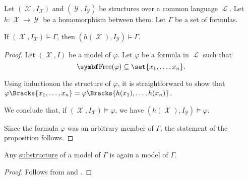 \begin{proposition}\label{thm:first_order_homomorphism_preserves_models}\mcite\cite[def. 23.8]{OpenLogic20201202}
  Let \( (\mscrX, I_{\mscrX}) \) and \( (\mscrY, I_{\mscrY}) \) be structures over a common language \( \mscrL \). Let \( h: \mscrX \to \mscrY \) be a homomorphism between them. Let \( \Gamma \) be a set of formulas.

  If \( (\mscrX, I_{\mscrX}) \models \Gamma \), then \( (h(\mscrX), I_{\mscrY}) \models \Gamma \).
\end{proposition}
\begin{proof}
  Let \( (\mscrX, I) \) be a model of \( \varphi \). Let \( \varphi \) be a formula in \( \mscrL \) such that
  \begin{equation*}
    \bfop{Free}(\varphi) \subseteq \set{x_1, \ldots, x_n}.
  \end{equation*}

  Using induction\IND on the structure of \( \varphi \), it is straightforward to show that \( \varphi\Bracks{x_1, \ldots, x_n} = \varphi\Bracks{h(x_1), \ldots, h(x_n)} \).

  We conclude that, if \( (\mscrX, I_{\mscrX}) \models \varphi \), we have \( (h(\mscrX), I_{\mscrY}) \models \varphi \).

  Since the formula \( \varphi \) was an arbitrary member of \( \Gamma \), the statement of the proposition follows.
\end{proof}

\begin{corollary}\label{thm:substructure_is_model}
  Any \hyperref[def:first_order_substructure]{substructure} of a model of \( \Gamma \) is again a model of \( \Gamma \).
\end{corollary}
\begin{proof}
  Follows from  and .
\end{proof}

\begin{remark}\label{rem:induction}
\end{remark}

\begin{definition}\label{def:first_order_model_category}
\end{definition}
